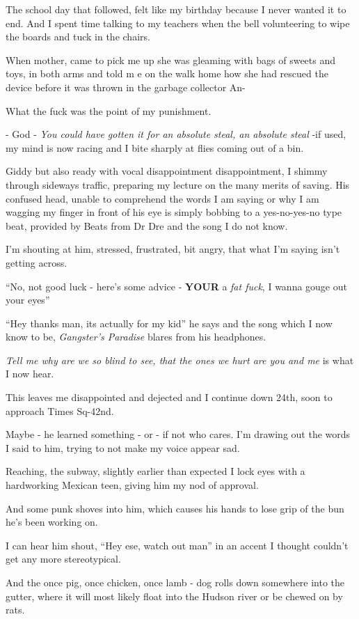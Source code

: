 \documentclass[19pt,openany]{book}
\begin{document}
The school day that followed,
felt like my birthday because
I never wanted it to end.
And I spent time talking to
my teachers when the bell volunteering
to wipe the boards and
tuck in the chairs.

When mother, came to pick me
up she was gleaming with bags of
sweets and toys, in both
arms and told m e on the walk
home how she had rescued the device
before it was thrown in
the garbage collector An-

What the fuck was the point
of my punishment.

- God - \textit{You
could have gotten it for
an absolute steal, an
absolute steal} -if
used, my mind is now racing
and I bite sharply at
flies coming out of a bin.

Giddy but also ready with vocal disappointment
disappointment, I shimmy through sideways
traffic, preparing my lecture on the many
merits of
saving. His confused head, unable
to comprehend the words I
am saying or why I am
wagging my finger in front of his
eye is simply bobbing to a yes-no-yes-no
type beat, provided by Beats from Dr Dre and
the song I do not know.

I'm shouting at him, stressed,
frustrated, bit angry, that what
I'm saying isn't getting across.

``No, not good luck - here's some
advice - \textbf{YOUR} a \textit{fat fuck}, I wanna
gouge out your eyes''

``Hey thanks man, its actually
for my kid'' he says
and
the song which I now know
to be, \textit{Gangster's Paradise}
blares
from his headphones.

\textit{Tell me why are we so
blind to see, that the
ones we hurt are you and me}
is what I now hear.

This leaves me disappointed
and dejected and I continue
down 24th, soon to approach
Times Sq-42nd.

Maybe - he learned something - or - if
not who cares. I'm drawing
out the words I said to him,
trying to not
make my voice appear sad.

Reaching, the subway,
slightly earlier than expected
I lock eyes
with a hardworking Mexican
teen,
giving him my nod of approval.

And some punk
shoves into him, which
causes his
hands to lose grip of the
bun he's been working on.

I can hear him shout, ``Hey
ese, watch out man'' in an
accent I thought couldn't
get any more stereotypical.

And the once pig, once
chicken, once lamb - dog rolls
down somewhere
into the gutter, where
it will most likely
float into the Hudson river
or be chewed on by rats.
\end{document}
